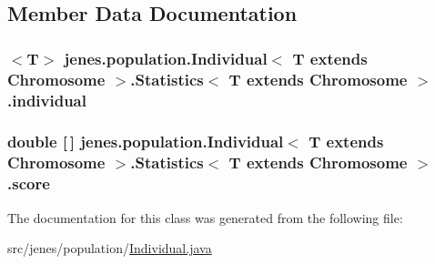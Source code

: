 \subsection{Member Data Documentation}
\hypertarget{classjenes_1_1population_1_1_individual_3_01_t_01extends_01_chromosome_01_4_1_1_statistics_3_01_t_01extends_01_chromosome_01_4_a83d9d35fe1430fba8ee7e7004e30c03d}{
\subsubsection[{individual}]{$<$T$>$ jenes.\-population.\-Individual$<$ T extends Chromosome $>$.{\bf Statistics}$<$ T extends Chromosome $>$.individual\hspace{0.3cm}{\ttfamily [private]}}}\label{classjenes_1_1population_1_1_individual_3_01_t_01extends_01_chromosome_01_4_1_1_statistics_3_01_t_01extends_01_chromosome_01_4_a83d9d35fe1430fba8ee7e7004e30c03d}
\hypertarget{classjenes_1_1population_1_1_individual_3_01_t_01extends_01_chromosome_01_4_1_1_statistics_3_01_t_01extends_01_chromosome_01_4_afa266e59b763737192a2a1698cf77121}{
\subsubsection[{score}]{\setlength{\rightskip}{0pt plus 5cm}double \mbox{[}$\,$\mbox{]} jenes.\-population.\-Individual$<$ T extends Chromosome $>$.{\bf Statistics}$<$ T extends Chromosome $>$.score\hspace{0.3cm}{\ttfamily [private]}}}\label{classjenes_1_1population_1_1_individual_3_01_t_01extends_01_chromosome_01_4_1_1_statistics_3_01_t_01extends_01_chromosome_01_4_afa266e59b763737192a2a1698cf77121}


The documentation for this class was generated from the following file\-:\begin{DoxyCompactItemize}
\item 
src/jenes/population/\hyperlink{_individual_8java}{Individual.\-java}\end{DoxyCompactItemize}
